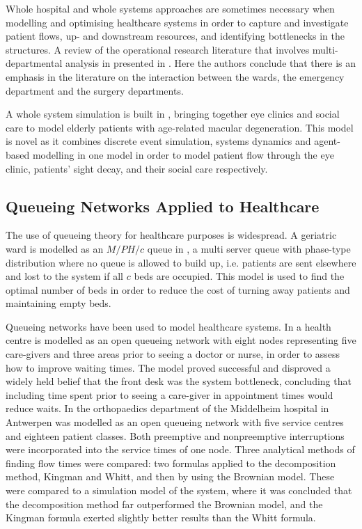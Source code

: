 \documentclass{article}
\begin{document}
Whole hospital and whole systems approaches are sometimes necessary when modelling and optimising healthcare systems in order to capture and investigate patient flows, up- and downstream resources, and identifying bottlenecks in the structures.
A review of the operational research literature that involves multi-departmental analysis in presented in \cite{twente09}.
Here the authors conclude that there is an emphasis in the literature on the interaction between the wards, the emergency department and the surgery departments.

A whole system simulation is built in \cite{vianaetal12}, bringing together eye clinics and social care to model elderly patients with age-related macular degeneration.
This model is novel as it combines discrete event simulation, systems dynamics and agent-based modelling in one model in order to model patient flow through the eye clinic, patients' sight decay, and their social care respectively.

\subsection{Queueing Networks Applied to Healthcare}
The use of queueing theory for healthcare purposes is widespread.
A geriatric ward is modelled as an $M/PH/c$ queue in \cite{gorunescuetal02}, a multi server queue with phase-type distribution where no queue is allowed to build up, i.e. patients are sent elsewhere and lost to the system if all $c$ beds are occupied.
This model is used to find the optimal number of beds in order to reduce the cost of turning away patients and maintaining empty beds.

Queueing networks have been used to model healthcare systems.
In \cite{albinetal90} a health centre is modelled as an open queueing network with eight nodes representing five care-givers and three areas prior to seeing a doctor or nurse, in order to assess how to improve waiting times.
The model proved successful and disproved a widely held belief that the front desk was the system bottleneck, concluding that including time spent prior to seeing a care-giver in appointment times would reduce waits.
In \cite{creemerslambrecht07} the orthopaedics department of the Middelheim hospital in Antwerpen was modelled as an open queueing network with five service centres and eighteen patient classes.
Both preemptive and nonpreemptive interruptions were incorporated into the service times of one node.
Three analytical methods of finding flow times were compared: two formulas applied to the decomposition method, Kingman and Whitt, and then by using the Brownian model.
These were compared to a simulation model of the system, where it was concluded that the decomposition method far outperformed the Brownian model, and the Kingman formula exerted slightly better results than the Whitt formula.
\end{document}
